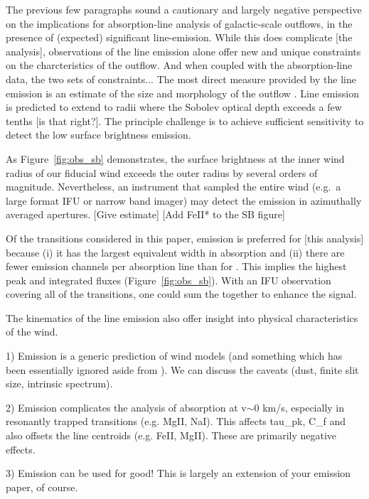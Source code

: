 \documentclass[12pt,preprint]{aastex}
\begin{document}
The previous few paragraphs sound a cautionary and largely negative
perspective on the implications for absorption-line analysis of
galactic-scale outflows, in the presence of (expected) significant
line-emission.   While this does complicate [the analysis],
observations of the line emission alone offer new and unique
constraints on the charcteristics of the outflow.  And when coupled
with the absorption-line data, the two sets of constraints...
The most direct measure provided by the line emission is an estimate
of the size and morphology of the outflow \citep[e.g.][]{rubin_emiss}.  
Line emission is predicted to extend to radii where the Sobolev
optical depth exceeds a few tenths [is that right?].  The principle
challenge is to achieve sufficient sensitivity to detect the low
surface brightness emission.  

As Figure~\ref{fig:obs_sb}
demonstrates, the surface brightness at the inner wind radius of our
fiducial wind exceeds the outer radius by several orders of magnitude.
Nevertheless, an instrument that sampled the entire wind (e.g.\ a
large format IFU or narrow band imager) may detect the emission in
azimuthally averaged apertures. [Give estimate]
[Add FeII* to the SB figure]

Of the transitions considered in this paper,  emission is
preferred for [this analysis] because 
(i) it has the largest equivalent width in absorption and
(ii) there are fewer emission channels per absorption line than for
.  This implies the highest peak and integrated fluxes
(Figure~\ref{fig:obs_sb}).  With an IFU observation covering all of
the  transitions, one could sum the together to enhance the
signal. 

The kinematics of the line emission also offer insight into physical
characteristics of the wind.


1)  Emission is a generic prediction of wind models (and something
which has been essentially ignored aside from \lya).  We can discuss
the caveats (dust, finite slit size, intrinsic spectrum).

2)  Emission complicates the analysis of absorption at v$\sim$0 km/s, especially in
resonantly trapped transitions (e.g. MgII, NaI).   This affects tau\_pk,
C\_f and also offsets the line centroids (e.g. FeII, MgII).  These
are primarily negative effects.

3)  Emission can be used for good!   This is largely an extension of
your emission paper, of course.
\end{document}
